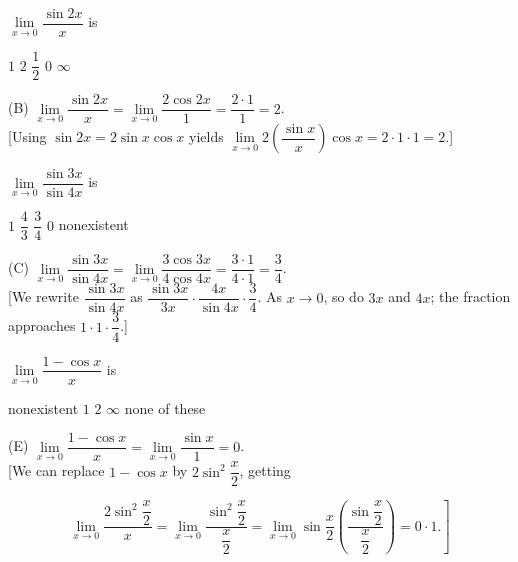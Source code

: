 \question
$\lim\limits_{x \to 0} \dfrac{\sin 2 x}{x}$ is
\begin{choices}
  \choice $1$
  \CorrectChoice $2$
  \choice $\dfrac{1}{2}$
  \choice $0$
  \choice $\infty$
\end{choices}
\begin{solution}
(B) $\lim\limits_{x \to 0} \dfrac{\sin 2 x}{x}=\lim\limits_{x \to 0} \dfrac{2 \cos 2 x}{1}=\dfrac{2 \cdot 1}{1}=2$.\\[0pt]
[Using $\sin 2 x=2 \sin x \cos x$ yields $\lim\limits_{x \to 0} 2\left(\dfrac{\sin x}{x}\right) \cos x=2 \cdot 1 \cdot 1=2$.]
\end{solution}





\newpage




\question
$\lim\limits_{x \to 0} \dfrac{\sin 3 x}{\sin 4 x}$ is
\begin{choices}
  \choice $1$
  \choice $\dfrac{4}{3}$
  \CorrectChoice $\dfrac{3}{4}$
  \choice $0$
  \choice nonexistent
\end{choices}
\begin{solution}
(C) $\lim\limits_{x \to 0} \dfrac{\sin 3 x}{\sin 4 x}=\lim\limits_{x \to 0} \dfrac{3 \cos 3 x}{4 \cos 4 x}=\dfrac{3 \cdot 1}{4 \cdot 1}=\dfrac{3}{4}$.\\[0pt]
[We rewrite $\dfrac{\sin 3 x}{\sin 4 x}$ as $\dfrac{\sin 3 x}{3 x} \cdot \dfrac{4 x}{\sin 4 x} \cdot \dfrac{3}{4}$. As $x \to 0$, so do $3 x$ and $4 x$; the fraction approaches $1 \cdot 1 \cdot \dfrac{3}{4}$.]
\end{solution}

\question
$\lim\limits_{x \to 0} \dfrac{1-\cos x}{x}$ is
\begin{choices}
  \choice nonexistent
  \choice $1$
  \choice $2$
  \choice $\infty$
  \CorrectChoice none of these
\end{choices}
\begin{solution}
(E) $\lim\limits_{x \to 0} \dfrac{1-\cos x}{x}=\lim\limits_{x \to 0} \dfrac{\sin x}{1}=0$.\\[0pt]
[We can replace $1-\cos x$ by $2 \sin ^{2} \dfrac{x}{2}$, getting

\[
\left.\lim\limits_{x \to 0} \dfrac{2 \sin ^{2} \dfrac{x}{2}}{x}=\lim\limits_{x \to 0} \dfrac{\sin ^{2} \dfrac{x}{2}}{\dfrac{x}{2}}=\lim\limits_{x \to 0} \sin \dfrac{x}{2}\left(\dfrac{\sin \dfrac{x}{2}}{\dfrac{x}{2}}\right)=0 \cdot 1 .\right]
\]


\end{solution}

